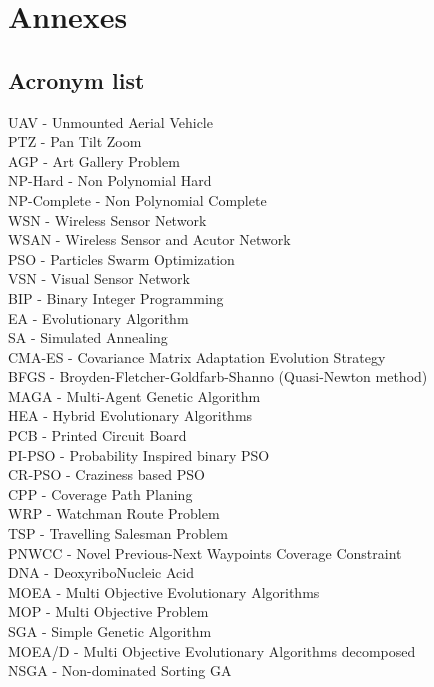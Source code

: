 \documentclass[english]{spimubphdthesis}
\begin{document}
\chapter{ Annexes}
\section{Acronym list}
UAV - Unmounted Aerial Vehicle \\
PTZ - Pan Tilt Zoom \\
AGP - Art Gallery Problem \\
NP-Hard - Non Polynomial Hard  \\ 
NP-Complete - Non Polynomial Complete  \\ 
WSN - Wireless Sensor Network \\
WSAN - Wireless Sensor and Acutor Network\\
PSO - Particles Swarm Optimization \\
VSN - Visual Sensor Network \\
BIP - Binary Integer Programming \\
EA - Evolutionary Algorithm \\
SA - Simulated Annealing \\
CMA-ES - Covariance Matrix Adaptation Evolution Strategy\\
BFGS - Broyden-Fletcher-Goldfarb-Shanno (Quasi-Newton method)\\
MAGA - Multi-Agent Genetic Algorithm \\
HEA - Hybrid Evolutionary Algorithms  \\
PCB - Printed Circuit Board  \\
PI-PSO  - Probability Inspired binary PSO \\
CR-PSO - Craziness based PSO  \\
CPP - Coverage Path Planing   \\
WRP - Watchman Route Problem \\ 
TSP - Travelling Salesman Problem \\ 
PNWCC - Novel Previous-Next Waypoints Coverage Constraint \\ 
DNA - DeoxyriboNucleic Acid \\
MOEA - Multi Objective Evolutionary Algorithms \\
MOP - Multi Objective Problem \\
SGA - Simple Genetic Algorithm  \\
MOEA/D - Multi Objective Evolutionary Algorithms  decomposed\\
NSGA - Non-dominated Sorting GA \\
\end{document}
